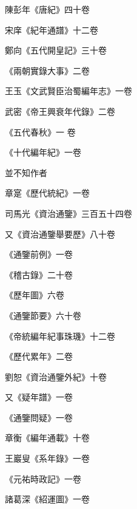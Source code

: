 \begin{pinyinscope}
 陳彭年《唐紀》四十卷



 宋庠《紀年通譜》十二卷



 鄭向《五代開皇記》三十卷



 《兩朝實錄大事》二卷



 王玉《文武賢臣治蜀編年志》一卷



 武密《帝王興衰年代錄》二卷



 《五代春秋》一
 卷



 《十代編年紀》一卷



 並不知作者



 章寔《歷代統紀》一卷



 司馬光《資治通鑒》三百五十四卷



 又《資治通鑒舉要歷》八十卷



 《通鑒前例》一卷



 《稽古錄》二十卷



 《歷年圖》六卷



 《通鑒節要》六十卷



 《帝統編年紀事珠璣》十二卷



 《歷代累年》二卷



 劉恕《資治通鑒外紀》十卷



 又《疑年譜》一卷



 《通鑒問疑》一卷



 章衡《編年通載》十卷



 王巖叟《系年錄》一卷



 《元祐時政記》一卷



 諸葛深《紹運圖》一卷




\end{pinyinscope}
